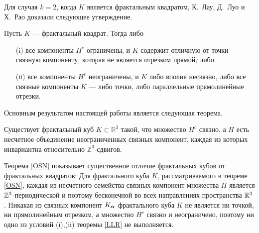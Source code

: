 Для случая $k=2$, когда $K$ является фрактальным квадратом, К.~Лау, Д.~Луо и Х.~Рао  доказали следующее утверждение.
\begin{theorem}\label{LLR}
Пусть $K$ --- фрактальный квадрат. Тогда  либо
\begin{itemize}[nolistsep]
\item[{\rm (i)}] все компоненты $H^c$  ограничены, и $K$ содержит отличную от точки связную компоненту, которая не является отрезком прямой\emph{;} либо
\item[{\rm (ii)}] все компоненты $H^c$  неограничены, и  $K$ либо вполне несвязно, либо все  связные компоненты $K$ --- либо точки, либо параллельные прямолинейные отрезки.
\end{itemize}
\end{theorem}

Основным результатом настоящей работы является следующая теорема.
\begin{theorem}\label{OSN}
Существует фрактальный куб  $K\subset \mathbb{R}^3$ такой, что множество $H^c$ связно, а $H$ есть несчетное объединение неограниченных связных компонент, каждая из которых инвариантна относительно $\mathbb{Z}^3$-сдвигов.
\end{theorem}

Теорема \ref{OSN} показывает существенное отличие фрактальных кубов от фрактальных квадратов:
Для фрактального куба $K$, рассматриваемого в теореме \ref{OSN}, каждая из несчетного семейства связных компонент множества $H$ является $\mathbb{Z}^3$-периодической и поэтому бесконечной во всех направлениях пространства $\mathbb{R}^3$. 
Никакая из связных компонент $K_{\bm{\alpha}}$ фрактального куба $K$ не является ни точкой, ни прямолинейным отрезком, а множество $H^c$ связно и неограничено, поэтому ни одно из условий (i),(ii) теоремы \ref{LLR} не выполняется.

